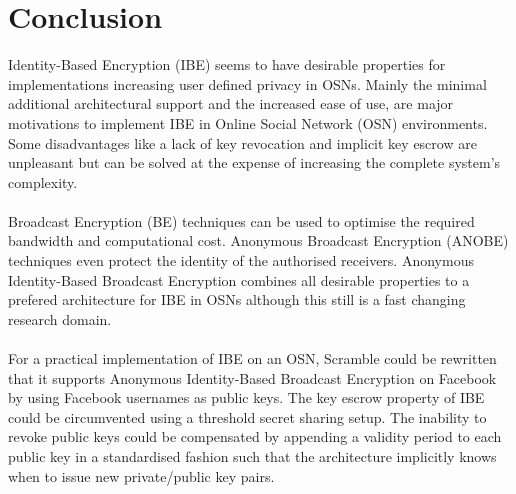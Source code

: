 \documentclass[journal]{IEEEtran}
\begin{document}
\section{Conclusion}
Identity-Based Encryption (IBE) seems to have desirable properties for
implementations increasing user defined privacy in OSNs. Mainly the minimal
additional architectural support and the increased ease of use, are major
motivations to implement IBE in Online Social Network (OSN) environments. Some
disadvantages like a lack of key revocation and implicit key escrow are
unpleasant but can be solved at the expense of increasing the complete system's
complexity.\\
\\
Broadcast Encryption (BE) techniques can be used to optimise the required
bandwidth and computational cost. Anonymous Broadcast Encryption (ANOBE)
techniques even protect the identity of the authorised receivers.
Anonymous Identity-Based Broadcast Encryption combines all desirable properties
to a prefered architecture for IBE in OSNs although this still is a fast
changing research domain.\\
\\
For a practical implementation of IBE on an OSN, Scramble could be rewritten
that it supports Anonymous Identity-Based Broadcast Encryption on Facebook by
using Facebook usernames as public keys. The key escrow property of IBE could
be circumvented using a threshold secret sharing setup. The inability to revoke
public keys could be compensated by appending a validity period to each public
key in a standardised fashion such that the architecture implicitly knows when
to issue new private/public key pairs.

%
\end{document}
